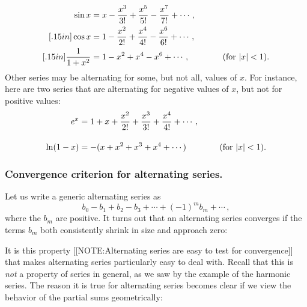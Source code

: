 \mbox{}
\begin{align*}
\sin{x} &= x - \dfrac{x^3}{3!} + \dfrac{x^5}{5!} 
                - \dfrac{x^7}{7!} + \cdots , \\ [.15in]
\cos{x} &= 1 - \dfrac{x^2}{2!} + \dfrac{x^4}{4!} 
                - \dfrac{x^6}{6!} + \cdots , \\ [.15in]
\dfrac{1}{1+x^2}&= 1 - x^2 + x^4 - x^6 + \cdots ,
                 \mbox{\hspace{.5in} (for $|x|<1$)}.
\end{align*}
Other series may be alternating for some, but not all, values of
$x$. For instance, here are two series that are alternating for
negative values of $x$, but not for positive values:
\begin{align*}
e^x &= 1 + x + \dfrac{x^2}{2!} + \dfrac{x^3}{3!} + 
          \dfrac{x^4}{4!} + \cdots ,  \\[.15in]
\ln(1-x) &= -(x + x^2 + x^3 + x^4 + \cdots )
         \mbox{\hspace{.5in} (for $|x|<1$)}.
\end{align*} 




\subsubsection{Convergence criterion for alternating series.}
Let us write a generic alternating series as
\[
b_0-b_1 + b_2 - b_3 + \cdots + (-1)^mb_m + \cdots \, ,
\]
where the $b_m$ are positive. It turns out that an alternating series converges if the terms $b_m$ both consistently shrink in size and approach zero:




\begin{center}
\end{center}




It is this property 
[[NOTE:Alternating series  are easy to test  for convergence]]
that makes alternating series particularly easy to deal with. Recall
that this is {\em not} a property of series in general, as we saw by
the example of the harmonic series.  The reason it is true for
alternating series becomes clear if we view the behavior of the
partial sums geometrically:

